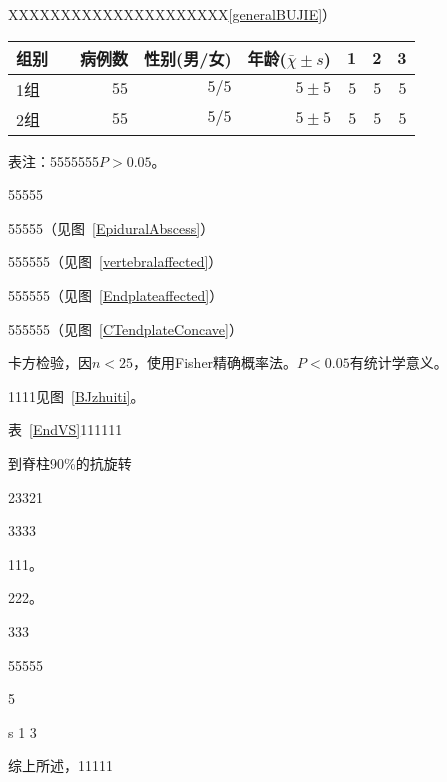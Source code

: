 
XXXXXXXXXXXXXXXXXXXXX\ref{generalBUJIE}）

\begin{table}[htbp]%
	\vspace{0.5em}\centering\wuhao
	\begin{tabular}{lrrrrrr}
		\toprule[1.5pt]
		组别 & 病例数　& 性别(男/女) & 年龄($\bar{\chi} \pm s$) & 1 & 2 & 3\\
		\midrule[1pt]
		1组 & $55$  & $5/5$ & $5 \pm 5$ & $5$ & $5$ & $5$\\
		2组 & $55$ &$5/5$ &$5 \pm 5$ & $5$ & $5$& $5$\\
		
		\bottomrule[1.5pt]
	\end{tabular}
\begin{flushleft}
\hspace{5em}\wuhao	表注：5555555$P> 0.05$。
\end{flushleft}
\end{table}


55555

55555（见图~\ref{EpiduralAbscess}）

555555（见图~\ref{vertebralaffected}）

555555（见图~\ref{Endplateaffected}）

555555（见图~\ref{CTendplateConcave}）



卡方检验，因$n<25$，使用Fisher精确概率法。$P< 0.05$有统计学意义。

1111见图~\ref{BJzhuiti}。


\newpage





表~\ref{EndVS}111111

到脊柱90\%的抗旋转

23321

3333

111。

222。

333


55555


5

s
1
3

综上所述，11111
	
	
